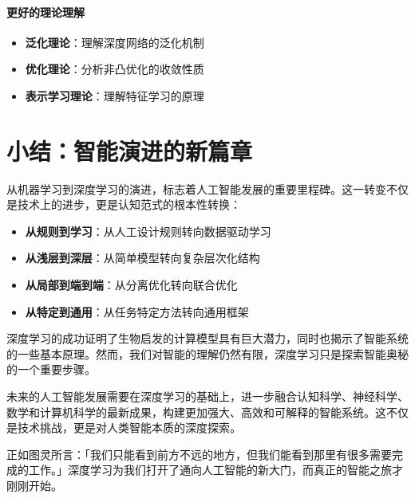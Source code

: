 \paragraph{更好的理论理解}
\begin{itemize}
\item {\bf 泛化理论}：理解深度网络的泛化机制
\item {\bf 优化理论}：分析非凸优化的收敛性质
\item {\bf 表示学习理论}：理解特征学习的原理
\end{itemize}

\section{小结：智能演进的新篇章}

从机器学习到深度学习的演进，标志着人工智能发展的重要里程碑。这一转变不仅是技术上的进步，更是认知范式的根本性转换：

\begin{itemize}
\item {\bf 从规则到学习}：从人工设计规则转向数据驱动学习
\item {\bf 从浅层到深层}：从简单模型转向复杂层次化结构
\item {\bf 从局部到端到端}：从分离优化转向联合优化
\item {\bf 从特定到通用}：从任务特定方法转向通用框架
\end{itemize}

深度学习的成功证明了生物启发的计算模型具有巨大潜力，同时也揭示了智能系统的一些基本原理。然而，我们对智能的理解仍然有限，深度学习只是探索智能奥秘的一个重要步骤。

未来的人工智能发展需要在深度学习的基础上，进一步融合认知科学、神经科学、数学和计算机科学的最新成果，构建更加强大、高效和可解释的智能系统。这不仅是技术挑战，更是对人类智能本质的深度探索。

正如图灵所言：「我们只能看到前方不远的地方，但我们能看到那里有很多需要完成的工作。」深度学习为我们打开了通向人工智能的新大门，而真正的智能之旅才刚刚开始。

\nocite{*}
\newpage